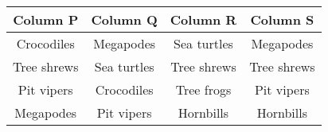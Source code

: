 \begin{center}
\begin{tabular}{|c|c|c|c|}
\hline
Column P & Column Q & Column R & Column S \\
\hline
Crocodiles & Megapodes & Sea turtles & Megapodes \\
Tree shrews & Sea turtles & Tree shrews & Tree shrews \\
Pit vipers & Crocodiles & Tree frogs & Pit vipers \\
Megapodes & Pit vipers & Hornbills & Hornbills \\
\hline
\end{tabular}
\end{center}